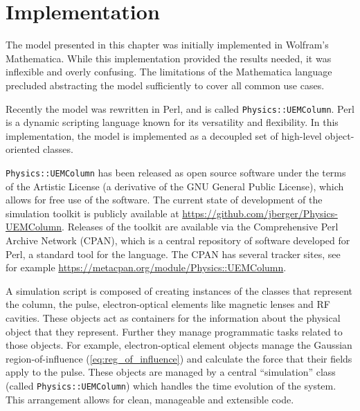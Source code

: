 \section{Implementation}



The model presented in this chapter was initially implemented in Wolfram's Mathematica.
While this implementation provided the results needed, it was inflexible and overly confusing.
The limitations of the Mathematica language precluded abstracting the model sufficiently to cover all common use cases.

Recently the model was rewritten in Perl, and is called \verb!Physics::UEMColumn!.
Perl is a dynamic scripting language known for its versatility and flexibility.
In this implementation, the model is implemented as a decoupled set of high-level object-oriented classes.

\verb!Physics::UEMColumn! has been released as open source software under the terms of the Artistic License (a derivative of the GNU General Public License), which allows for free use of the software.
The current state of development of the simulation toolkit is publicly available at \url{https://github.com/jberger/Physics-UEMColumn}.
Releases of the toolkit are available via the Comprehensive Perl Archive Network (CPAN), which is a central repository of software developed for Perl, a standard tool for the language.
The CPAN has several tracker sites, see for example \url{https://metacpan.org/module/Physics::UEMColumn}.

A simulation script is composed of creating instances of the classes that represent the column, the pulse, electron-optical elements like magnetic lenses and RF cavities.
These objects act as containers for the information about the physical object that they represent.
Further they manage programmatic tasks related to those objects.
For example, electron-optical element objects manage the Gaussian region-of-influence (\ref{eq:reg_of_influence}) and calculate the force that their fields apply to the pulse.
These objects are managed by a central ``simulation'' class (called \verb!Physics::UEMColumn!) which handles the time evolution of the system.
This arrangement allows for clean, manageable and extensible code.

